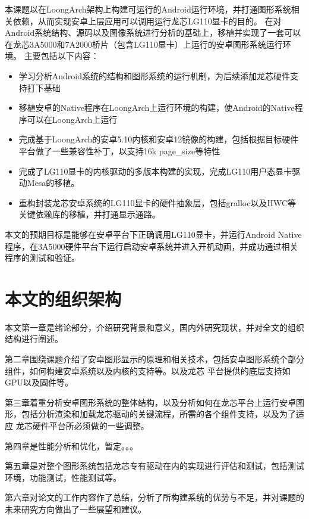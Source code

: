 本课题以在LoongArch架构上构建可运行的Android运行环境，并打通图形系统相关依赖，从而实现安卓上层应用可以调用运行龙芯LG110显卡的目的。
在对Android系统结构、源码以及图像系统进行分析的基础上，移植并实现了一套可以在龙芯3A5000和7A2000桥片（包含LG110显卡）上运行的安卓图形系统运行环境。
主要包括以下内容：
\begin{itemize}
  \item 学习分析Android系统的结构和图形系统的运行机制，为后续添加龙芯硬件支持打下基础
  \item 移植安卓的Native程序在LoongArch上运行环境的构建，使Android的Native程序可以在LoongArch上运行
  \item 完成基于LoongArch的安卓5.10内核和安卓12镜像的构建，包括根据目标硬件平台做了一些兼容性补丁，以支持16k page\_size等特性
  \item 完成了LG110显卡的内核驱动的多版本构建的实现，完成LG110用户态显卡驱动Mesa的移植。
  \item 重构封装龙芯安卓系统的LG110显卡的硬件抽象层，包括gralloc以及HWC等关键依赖库的移植，并打通显示通路。
\end{itemize}
本文的预期目标是能够在安卓平台下正确调用LG110显卡，并运行Android Native程序，在3A5000硬件平台下运行启动安卓系统并进入开机动画，并成功通过相关
程序的测试和验证。

\section{本文的组织架构}
本文第一章是绪论部分，介绍研究背景和意义，国内外研究现状，并对全文的组织结构进行阐述。

第二章围绕课题介绍了安卓图形显示的原理和相关技术，包括安卓图形系统个部分组件，如何构建安卓系统以及内核的支持等。以及龙芯
平台提供的底层支持如GPU以及固件等。

第三章着重分析安卓图形系统的整体结构，以及分析如何在龙芯平台上运行安卓图形，包括分析渲染和加载龙芯驱动的关键流程，所需的各个组件支持，以及为了适应
龙芯硬件平台所必须做的一些调整。

第四章是性能分析和优化，暂定。。。

第五章是对整个图形系统包括龙芯专有驱动在内的实现进行评估和测试，包括测试环境，功能测试，性能测试等。

第六章对论文的工作内容作了总结，分析了所构建系统的优势与不足，并对课题的未来研究方向做出了一些展望和建议。

